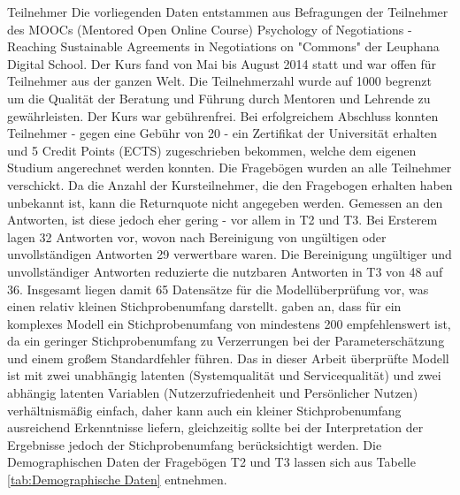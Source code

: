 Teilnehmer
Die vorliegenden Daten entstammen aus Befragungen der Teilnehmer des MOOCs (Mentored Open Online Course) Psychology of Negotiations - Reaching Sustainable Agreements in Negotiations on "Commons"  der Leuphana Digital School. Der Kurs fand von Mai bis August 2014 statt und war offen für Teilnehmer aus der ganzen Welt. Die Teilnehmerzahl wurde auf 1000 begrenzt um die Qualität der Beratung und Führung durch Mentoren und Lehrende zu gewährleisten. Der Kurs war gebührenfrei. Bei erfolgreichem Abschluss konnten   Teilnehmer - gegen eine Gebühr von 20 	\texteuro - ein Zertifikat der Universität erhalten und 5 Credit Points (ECTS) zugeschrieben bekommen, welche dem eigenen Studium angerechnet werden konnten.   
Die Fragebögen wurden an alle Teilnehmer verschickt. Da die Anzahl der Kursteilnehmer, die den Fragebogen erhalten haben unbekannt ist, kann die Returnquote nicht angegeben werden. Gemessen an den Antworten, ist diese jedoch eher gering - vor allem in T2 und T3. Bei Ersterem lagen 32 Antworten vor, wovon nach Bereinigung von ungültigen oder unvollständigen Antworten 29 verwertbare waren. Die Bereinigung ungültiger und unvollständiger Antworten reduzierte die nutzbaren Antworten in T3 von 48 auf 36. Insgesamt liegen damit 65 Datensätze für die Modellüberprüfung vor, was einen relativ kleinen Stichprobenumfang darstellt. \cite[S. 5]{jakobowicz2006understanding} gaben an, dass für ein komplexes Modell ein Stichprobenumfang von mindestens 200 empfehlenswert ist, da ein geringer Stichprobenumfang zu Verzerrungen bei der Parameterschätzung und einem großem Standardfehler führen. Das in dieser Arbeit überprüfte Modell ist mit zwei unabhängig latenten (Systemqualität und Servicequalität) und zwei abhängig latenten Variablen (Nutzerzufriedenheit und Persönlicher Nutzen) verhältnismäßig einfach, daher kann auch ein kleiner Stichprobenumfang ausreichend Erkenntnisse liefern, gleichzeitig sollte bei der Interpretation der Ergebnisse jedoch der Stichprobenumfang berücksichtigt werden. 
Die Demographischen Daten der Fragebögen T2 und T3 lassen sich aus Tabelle\,\ref{tab:Demographische Daten} entnehmen. 
 

